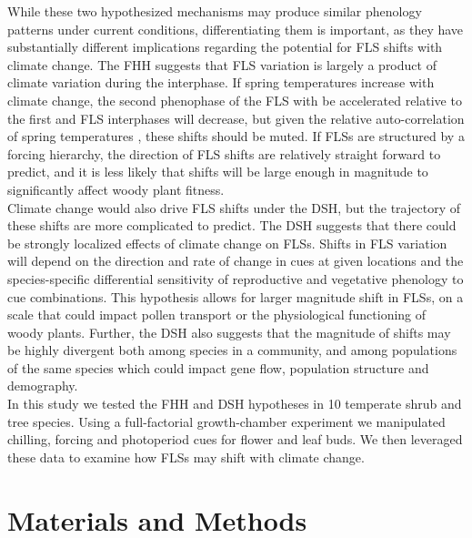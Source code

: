 \documentclass[11pt]{article}\usepackage[]{graphicx}\usepackage[]{color}
\begin{document}
\noident While these two hypothesized mechanisms may produce similar phenology patterns under current conditions, differentiating them %
is important, as they have substantially different implications regarding the potential for FLS shifts with climate change. The FHH suggests that FLS variation is largely a product of climate variation during the interphase. If spring temperatures increase with climate change, the second phenophase of the FLS with be accelerated relative to the first and FLS interphases will decrease, but given the relative auto-correlation of spring temperatures \citep{Di-Cecco:2018aa}, these shifts should be muted. If FLSs are structured by a forcing hierarchy, the direction of FLS shifts are relatively straight forward to predict, and it is less likely that shifts will be large enough in magnitude to significantly affect woody plant fitness.\\

\noindent Climate change would also drive FLS shifts under the DSH, but the trajectory of these shifts are more complicated to predict. The DSH suggests that there could be strongly localized effects of climate change on FLSs. Shifts in FLS variation will depend on the direction and rate of change in cues at given locations and the species-specific differential sensitivity of reproductive and vegetative phenology to cue combinations. This hypothesis allows for larger magnitude shift in FLSs, on a scale that could impact pollen transport or the physiological functioning of woody plants. Further, the DSH also suggests that the magnitude of shifts may be highly divergent both among species in a community, and among populations of the same species which could impact gene flow, population structure and demography.\\

\noindent In this study we tested the FHH and DSH hypotheses in 10 temperate shrub and tree species. Using a full-factorial growth-chamber experiment we manipulated chilling, forcing and photoperiod cues for flower and leaf buds. We then leveraged these data to examine how FLSs may shift with climate change.\\ %

\section*{Materials and Methods}
\end{document}
